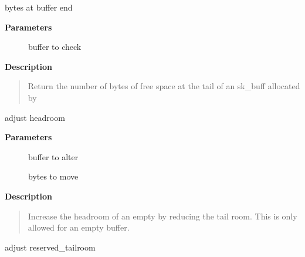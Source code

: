 \documentclass[a4paper,8pt,english]{sphinxmanual}
\begin{document}
\begin{fulllineitems}
\label{networking/kapi:c.skb_availroom}
bytes at buffer end

\end{fulllineitems}


\textbf{Parameters}
\begin{description}
\item[{}] \leavevmode
buffer to check

\end{description}

\textbf{Description}
\begin{quote}

Return the number of bytes of free space at the tail of an sk\_buff
allocated by 
\end{quote}

\begin{fulllineitems}
\label{networking/kapi:c.skb_reserve}
adjust headroom

\end{fulllineitems}


\textbf{Parameters}
\begin{description}
\item[{}] \leavevmode
buffer to alter

\item[{}] \leavevmode
bytes to move

\end{description}

\textbf{Description}
\begin{quote}

Increase the headroom of an empty {\hyperref[networking/kapi:c.sk_buff]{\emph{}}} by reducing the tail
room. This is only allowed for an empty buffer.
\end{quote}

\begin{fulllineitems}
\label{networking/kapi:c.skb_tailroom_reserve}
adjust reserved\_tailroom

\end{fulllineitems}
\end{document}
